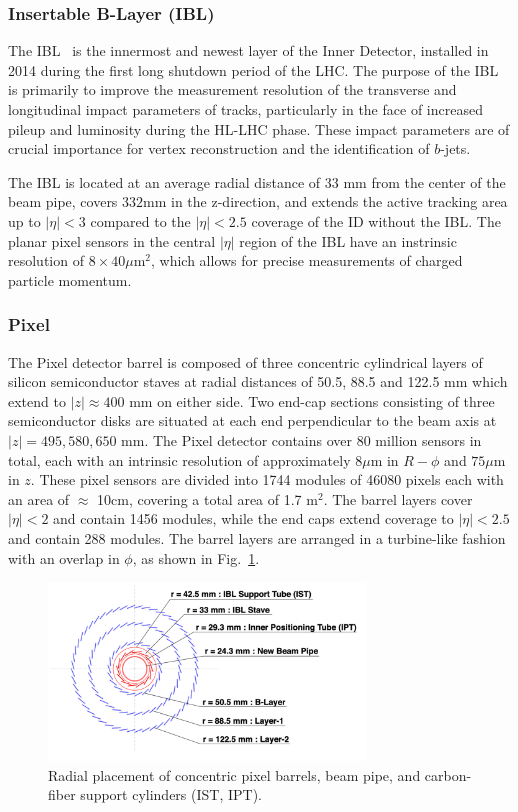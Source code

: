 \subsubsection{Insertable B-Layer (IBL)}
The IBL~\cite{Capeans:1291633} is the innermost and newest layer of the Inner Detector, installed in 2014 during the first long shutdown period of the LHC.
The purpose of the IBL is primarily to improve the measurement resolution of the transverse and longitudinal impact parameters of tracks, particularly in the face of increased pileup and luminosity during the HL-LHC phase.
These impact parameters are of crucial importance for vertex reconstruction and the identification of $b$-jets. 

The IBL is located at an average radial distance of 33 mm from the center of the beam pipe, covers $332$mm in the z-direction, and extends the active tracking area up to $|\eta| < 3$ compared to the $|\eta| < 2.5$ coverage of the ID without the IBL.
The planar pixel sensors in the central $|\eta|$ region of the IBL have an instrinsic resolution of $8 \times 40 \mu \mathrm{m}^2$, which allows for precise measurements of charged particle momentum.

\subsubsection{Pixel}
The Pixel detector barrel is composed of three concentric cylindrical layers of silicon semiconductor staves at radial distances of 50.5, 88.5 and 122.5 mm which extend to $|z| \approx 400$ mm on either side.
Two end-cap sections consisting of three semiconductor disks are situated at each end perpendicular to the beam axis at $|z| = 495, 580, 650$ mm.
The Pixel detector contains over 80 million sensors in total, each with an intrinsic resolution of approximately $8\mu$m in $R-\phi$ and $75\mu$m in $z$.
These pixel sensors are divided into 1744 modules of 46080 pixels each with an area of $\approx$ 10cm, covering a total area of 1.7 $\mathrm{m}^2$.
The barrel layers cover $|\eta| < 2$ and contain 1456 modules, while the end caps extend coverage to $|\eta| < 2.5$ and contain 288 modules.
The barrel layers are arranged in a turbine-like fashion with an overlap in $\phi$, as shown in Fig.~\ref{fig:pixel_ibl_cross_section}.

\begin{figure}
	\centering
	\includegraphics[width=0.75\textwidth]{pixel_ibl_cross_section}
	\caption{Radial placement of concentric pixel barrels, beam pipe, and carbon-fiber support cylinders (IST, IPT). \cite{Pernegger:1985432} }
	\label{fig:pixel_ibl_cross_section}
\end{figure}


